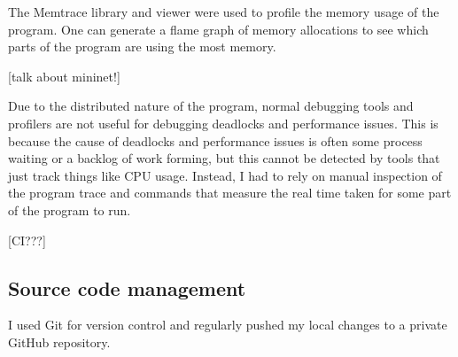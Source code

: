 The Memtrace library and viewer were used to profile the memory usage of the program. One can generate a flame graph of memory allocations to see which parts of the program are using the most memory.

[talk about mininet!]

Due to the distributed nature of the program, normal debugging tools and profilers are not useful for debugging deadlocks and performance issues. This is because the cause of deadlocks and performance issues is often some process waiting or a backlog of work forming, but this cannot be detected by tools that just track things like CPU usage. Instead, I had to rely on manual inspection of the program trace and commands that measure the real time taken for some part of the program to run.

[CI???]

\subsection{Source code management}

I used Git for version control and regularly pushed my local changes to a private GitHub repository.